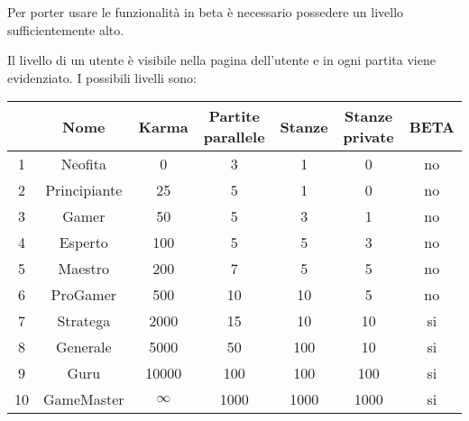 Per porter usare le funzionalità in beta è necessario possedere un livello sufficientemente alto.

Il livello di un utente è visibile nella pagina dell'utente e in ogni partita viene evidenziato. I possibili livelli sono:

\begin{tabular}{|c|c|c|c|c|c|c|}
	\hline
	& \textbf{Nome} & \textbf{Karma} & \textbf{Partite parallele} & \textbf{Stanze} & \textbf{Stanze private} & \textbf{BETA} \\
	\hline
	1 & Neofita 	 & 0    &   3 &   1 &   0 & no \\
	2 & Principiante & 25   &   5 &   1 &   0 & no \\
	3 & Gamer        & 50   &   5 &   3 &   1 & no \\
	4 & Esperto      & 100  &   5 &   5 &   3 & no \\
	5 & Maestro      & 200  &   7 &   5 &   5 & no \\
	6 & ProGamer     & 500  &  10 &  10 &   5 & no \\
	7 & Stratega     & 2000 &  15 &  10 &  10 & si \\
	8 & Generale     & 5000 &  50 & 100 &  10 & si \\
	9 & Guru         & 10000& 100 & 100 & 100 & si \\
	10 & GameMaster   & $\infty$ & 1000 & 1000 & 1000 & si \\
	\hline
\end{tabular}